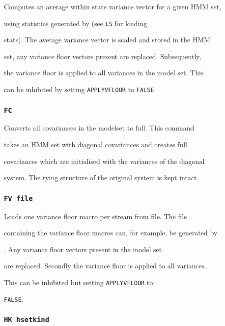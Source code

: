 Computes an average within state variance vector for a given HMM set,


using statistics generated by  (see {\tt LS} for loading


stats).  The average variance vector is scaled and stored in the HMM


set, any variance floor vectors present are replaced. Subsequently,


the variance floor is applied to all variances in the model set. This


can be inhibited by setting \texttt{APPLYVFLOOR} to \texttt{FALSE}.





\subsubsection*{\tt FC}





Converts all covariances in the modelset to full. This command


takes an HMM set with diagonal covariances and creates full


covariances which are initialised with the variances of the diagonal


system. The tying structure of the original system is kept intact.





\subsubsection*{\tt FV file} 





Loads one variance floor macro per stream from file. The file


containing the variance floor macros can, for example, be generated by


. Any variance floor vectors present in the model set


are replaced. Secondly the variance floor is applied to all variances.


This can be inhibited but setting \texttt{APPLYVFLOOR} to


\texttt{FALSE}.





\subsubsection*{\tt HK hsetkind}





